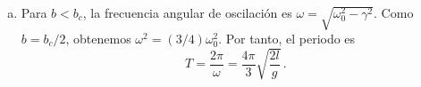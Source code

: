 \begin{enumerate}[a)]
	\item Para $b<b_{c}$, la frecuencia angular de oscilaci\'on es $\omega=\sqrt{\omega_{0}^{2}-\gamma^{2}}$. Como $b=b_{c}/2$, obtenemos $\omega^{2}=(3/4)\omega_{0}^{2}$. Por tanto, el periodo es
	\begin{equation*}
		T=\frac{2\pi}{\omega}=\frac{4\pi}{3}\sqrt{\frac{2l}{g}}\,.
	\end{equation*}
\end{enumerate}
